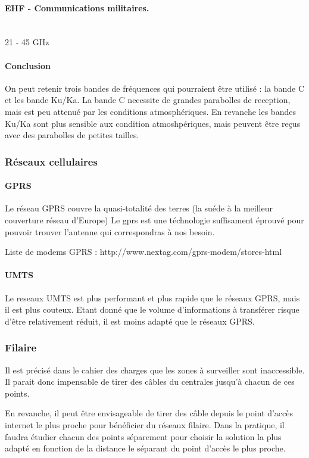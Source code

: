         \paragraph{EHF - Communications militaires.}~\\
        21 - 45 GHz 
        
        \paragraph{Conclusion}
            On peut retenir trois bandes de fréquences qui pourraient être utilisé : la bande C et les bande Ku/Ka.
            La bande C necessite de grandes parabolles de reception, mais est peu attenué par les conditions atmosphériques.
            En revanche les bandes Ku/Ka sont plus sensible aux condition atmoshpériques, mais peuvent être reçus avec des parabolles de petites tailles.

    \subsubsection{Réseaux cellulaires}

        \paragraph{GPRS}
            Le réseau GPRS couvre la quasi-totalité des terres (la suéde à la meilleur couverture réseau d'Europe)
            Le gprs est une téchnologie suffisament éprouvé pour pouvoir trouver l'antenne qui correspondras à nos besoin.


            Liste de modems GPRS :
            http://www.nextag.com/gprs-modem/stores-html



        \paragraph{UMTS}
            Le reseaux UMTS est plus performant et plus rapide que le réseaux GPRS, mais il est plus couteux.
            Etant donné que le volume d'informations à transférer risque d'être relativement réduit, il est moins adapté que le réseaux GPRS.
            
                
    \subsubsection{Filaire}
        Il est précisé dans le cahier des charges que les zones à surveiller sont inaccessible.
        Il parait donc impensable de tirer des câbles du centrales jusqu'à chacun de ces points.

        En revanche, il peut être envisageable de tirer des câble depuis le point d'accès internet le plus proche pour bénéficier du réseaux filaire.
        Dans la pratique, il faudra étudier chacun des points séparement pour choisir la solution la plus adapté en fonction de la distance le séparant du point d'accès le plus proche.
